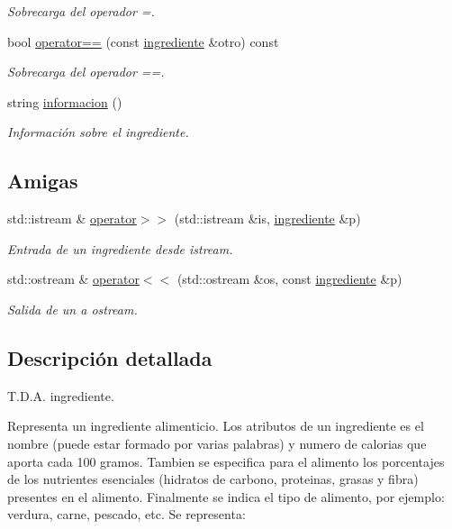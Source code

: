 \begin{DoxyCompactItemize}
\begin{DoxyCompactList}\small\item\em Sobrecarga del operador =. \end{DoxyCompactList}\item 
bool \hyperlink{classingrediente_aa3bc521369e0ba37383ca0958697f5af}{operator==} (const \hyperlink{classingrediente}{ingrediente} \&otro) const
\begin{DoxyCompactList}\small\item\em Sobrecarga del operador ==. \end{DoxyCompactList}\item 
string \hyperlink{classingrediente_a51a8da90674bb8d5f3c4019e87ad5e67}{informacion} ()
\begin{DoxyCompactList}\small\item\em Información sobre el ingrediente. \end{DoxyCompactList}\end{DoxyCompactItemize}
\subsection*{Amigas}
\begin{DoxyCompactItemize}
\item 
std\+::istream \& \hyperlink{classingrediente_a934ac4c1bed7330ab27297cf27b994df}{operator$>$$>$} (std\+::istream \&is, \hyperlink{classingrediente}{ingrediente} \&p)
\begin{DoxyCompactList}\small\item\em Entrada de un ingrediente desde istream. \end{DoxyCompactList}\item 
std\+::ostream \& \hyperlink{classingrediente_ae7d30d9b20aead90a4d3b11a4ff57e21}{operator$<$$<$} (std\+::ostream \&os, const \hyperlink{classingrediente}{ingrediente} \&p)
\begin{DoxyCompactList}\small\item\em Salida de un a ostream. \end{DoxyCompactList}\end{DoxyCompactItemize}


\subsection{Descripción detallada}
T.\+D.\+A. ingrediente. 

Representa un ingrediente alimenticio. Los atributos de un ingrediente es el nombre (puede estar formado por varias palabras) y numero de calori­as que aporta cada 100 gramos. Tambien se especifica para el alimento los porcentajes de los nutrientes esenciales (hidratos de carbono, protei­nas, grasas y fibra) presentes en el alimento. Finalmente se indica el tipo de alimento, por ejemplo\+: verdura, carne, pescado, etc. Se representa\+:

